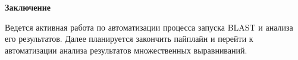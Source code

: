 \newpage
\begin{center}
  \textbf{\large Заключение}
\end{center}


Ведется активная работа по автоматизации процесса запуска BLAST и анализа его результатов.
Далее планируется закончить пайплайн и перейти к автоматизации анализа результатов множественных выравниваний.
